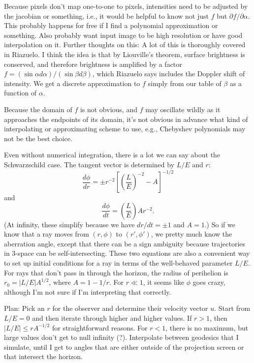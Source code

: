 \documentclass{article}
\begin{document}
Because pixels don't map one-to-one to pixels, intensities need to be
adjusted by the jacobian or something, i.e., it would be helpful to
know not just $f$ but $\partial f/\partial\alpha$. This probably happens for
free if I find a polynomial approximation or something. Also probably want
input image to be high resolution or have good interpolation on it. 
Further thoughts on this: A lot of this is thoroughly covered in Riazuelo.
I think the idea is that by Liouville's theorem, surface brightness is conserved,
and therefore brightness is amplified by a factor $f=(\sin\alpha d\alpha)/(\sin\beta d\beta)$,
which Riazuelo says includes the Doppler shift of intensity. We get a discrete approximation
to $f$ simply from our table of $\beta$ as a function of $\alpha$.

Because the domain of $f$ is not obvious, and $f$ may oscillate wildly as it
approaches the endpoints of its domain, it's not obvious in advance what
kind of interpolating or approximating scheme to use, e.g., Chebyshev polynomials
may not be the best choice.

Even without numerical integration, there is a lot we can say about the Schwarzschild case.
The tangent vector is determined by $L/E$ and $r$:
\begin{equation*}
  \frac{d\phi}{dr} = \pm r^{-2}\left[\left(\frac{L}{E}\right)^{-2}-A\right]^{-1/2}
\end{equation*}
and
\begin{equation*}
  \frac{d\phi}{dt} = \left(\frac{L}{E}\right)Ar^{-2}.
\end{equation*}
(At infinity, these simplify because we have $dr/dt=\pm 1$ and $A=1$.) So if we know that a ray
moves from $(r,\phi)$ to $(r',\phi')$, we pretty much know the aberration angle, except that there
can be a sign ambiguity because trajectories in 3-space can be self-intersecting.
These two equations are also a convenient way to set up initial conditions for a ray in terms
of the well-behaved parameter $L/E$.
For rays that don't pass in through the horizon, the radius of perihelion is $r_0=|L/E|A^{1/2}$, where
$A=1-1/r$. For $r \ll 1$, it seems like $\phi$ goes crazy, although I'm not sure if I'm interpreting that
correctly.

Plan: Pick an $r$ for the observer and determine their velocity vector $u$.
Start from $L/E=0$ and then iterate through higher and higher values.
If $r>1$, then $|L/E| \le rA^{-1/2}$ for
straightforward reasons. For $r<1$, there is no maximum, but large values don't
get to null infinity (?).
Interpolate between geodesics that I simulate, until I get to angles that are
either outside of the projection screen or that intersect the horizon.
\end{document}
